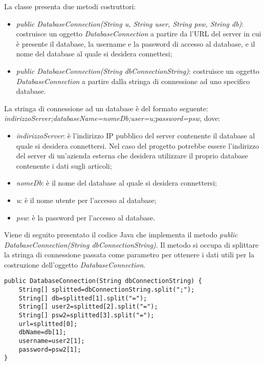 La classe presenta due metodi costruttori:
\begin{itemize}
	\item \textit{public DatabaseConnection(String u, String user, String psw, String db)}: costruisce un oggetto \textit{DatabaseConnection} a partire  da l'URL del server in cui è presente il database, la username e la password di accesso al database, e il nome del database al quale si desidera connettesi;
	\item \textit{public DatabaseConnection(String dbConnectionString)}: costruisce un oggetto \textit{DatabaseConnection} a partire dalla stringa di connessione ad uno specifico database.
\end{itemize}
La stringa di connessione ad un database è del formato seguente: \textit{indirizzoServer;databaseName=nomeDb;user=u;password=psw}, dove:
\begin{itemize}
	\item \textit{indirizzoServer}: è l'indirizzo IP pubblico del server contenente il database al quale si desidera connettersi. Nel caso del progetto potrebbe essere l'indirizzo del server di un'azienda esterna che desidera utilizzare il proprio database contenente i dati sugli articoli;
	\item \textit{nomeDb}: è il nome del database al quale si desidera connettersi;
	\item \textit{u}: è il nome utente per l'accesso al database;
	\item \textit{psw}: è la password per l'accesso al database.
\end{itemize}
Viene di seguito presentato il codice Java che implementa il metodo \textit{public DatabaseConnection(String dbConnectionString)}. Il metodo si occupa di splittare la stringa di connessione passata come parametro per ottenere i dati utili per la costruzione dell'oggetto \textit{DatabaseConnection}.
\begin{lstlisting}
public DatabaseConnection(String dbConnectionString) {
	String[] splitted=dbConnectionString.split(";");
	String[] db=splitted[1].split("=");
	String[] user2=splitted[2].split("=");
	String[] psw2=splitted[3].split("=");
	url=splitted[0];
	dbName=db[1];
	username=user2[1];
	password=psw2[1];
}
\end{lstlisting}



